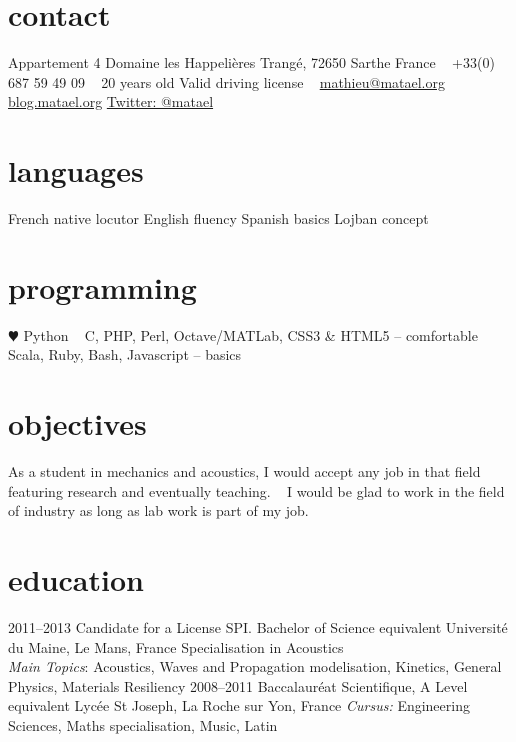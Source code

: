 \documentclass[]{friggeri-cv} %
\begin{document}


\begin{aside} %
\section{contact}
Appartement 4
Domaine les Happelières
Trangé, 72650 Sarthe
France
~
+33(0) 687 59 49 09
~
20 years old
Valid driving license
~
\href{mailto:mathieu@matael.org}{mathieu@matael.org}
\href{http://blog.matael.org}{blog.matael.org}
\href{http://twitter.com/matael}{Twitter: @matael}
\section{languages}
French native locutor
English fluency
Spanish basics
Lojban concept
\section{programming}
{\color{red} $\varheartsuit$} Python
~
C, PHP, Perl, Octave/MATLab, CSS3 \& HTML5 -- comfortable
~
Scala, Ruby, Bash, Javascript -- basics
\section{objectives}
As a student in mechanics and acoustics, I would accept any job in that field featuring research and eventually
teaching.
~
I would be glad to work in the field of industry as long as lab work is part of my job.
\end{aside}



\section{education}

\begin{entrylist}
\entry
{2011--2013}
{{\normalfont Candidate for a License SPI.} Bachelor of Science {\normalfont equivalent}}
{Université du Maine, Le Mans, France}
{Specialisation in Acoustics \\\emph{Main Topics}: Acoustics, Waves and Propagation
modelisation, Kinetics, General Physics, Materials Resiliency}
\entry
{2008--2011}
{{\normalfont Baccalauréat Scientifique,} A Level {\normalfont equivalent}} 
{Lycée St Joseph, La Roche sur Yon, France}
{\emph{Cursus:} Engineering Sciences, Maths specialisation, Music, Latin}
\end{entrylist}
\end{document}
